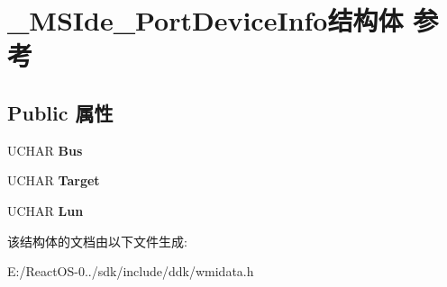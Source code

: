 \hypertarget{struct___m_s_ide___port_device_info}{}\section{\+\_\+\+M\+S\+Ide\+\_\+\+Port\+Device\+Info结构体 参考}
\label{struct___m_s_ide___port_device_info}
\subsection*{Public 属性}
\begin{DoxyCompactItemize}
\item 
\mbox{\label{struct___m_s_ide___port_device_info_a2c5a02ee0d198d9c0743a0a312e39535}} 
U\+C\+H\+AR {\bfseries Bus}
\item 
\mbox{\label{struct___m_s_ide___port_device_info_adf8b5e698e76e2062a05f6dd6d383352}} 
U\+C\+H\+AR {\bfseries Target}
\item 
\mbox{\label{struct___m_s_ide___port_device_info_a0a009f3ebf02407c60d65fecb22d305d}} 
U\+C\+H\+AR {\bfseries Lun}
\end{DoxyCompactItemize}


该结构体的文档由以下文件生成\+:\begin{DoxyCompactItemize}
\item 
E\+:/\+React\+O\+S-\/0../sdk/include/ddk/wmidata.\+h\end{DoxyCompactItemize}
